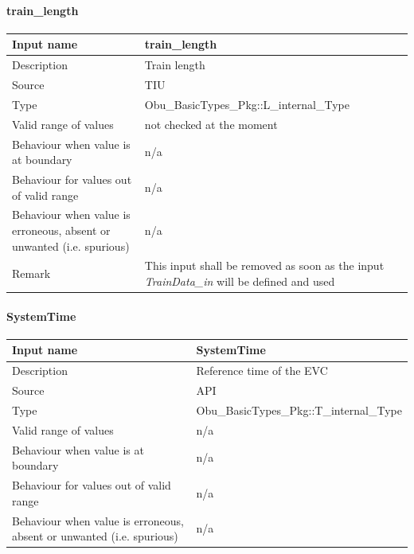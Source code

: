 \paragraph{train\_length}

\begin{longtable}{p{}p{}}
\toprule
Input name				& train\_length\\
\midrule
Description				& Train length\\
\midrule
Source					& TIU \\ 
\midrule
Type					& Obu\_BasicTypes\_Pkg::L\_internal\_Type\\
\midrule
Valid range of values	& not checked at the moment \\
\midrule
Behaviour when value is at boundary	& n/a\\
\midrule
Behaviour for values out of valid range	& n/a\\
\midrule
Behaviour when value is erroneous, absent or unwanted (i.e. spurious) & n/a\\
\midrule
Remark & This input shall be removed as soon as the input \emph{TrainData\_in} will be defined and used\\
\bottomrule


\end{longtable}

\paragraph{SystemTime}

\begin{longtable}{p{}p{}}
\toprule
Input name				& SystemTime\\
\midrule
Description				& Reference time of the EVC\\
\midrule
Source					& API \\ 
\midrule
Type					& Obu\_BasicTypes\_Pkg::T\_internal\_Type\\
\midrule
Valid range of values	& n/a \\
\midrule
Behaviour when value is at boundary	& n/a\\
\midrule
Behaviour for values out of valid range	& n/a\\
\midrule
Behaviour when value is erroneous, absent or unwanted (i.e. spurious) & n/a\\

\bottomrule

\end{longtable}

